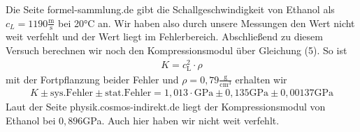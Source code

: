 \documentclass[a4paper, 12pt]{scrartcl}
\begin{document}
Die Seite formel-sammlung.de gibt die Schallgeschwindigkeit von Ethanol als $c_L= 1190\frac{\textrm{m}}{\textrm{s}}$ bei 20°C an. Wir haben also durch unsere Messungen den Wert nicht weit verfehlt und der Wert liegt im Fehlerbereich. Abschließend zu diesem Versuch berechnen wir noch den Kompressionsmodul über Gleichung (5). 
So ist 
\begin{align*}
K = c_\textrm{L}^2 \cdot \rho
\end{align*}
mit der Fortpflanzung beider Fehler und $\rho=0,79 \frac{\textrm{g}}{\textrm{cm}^3}$ erhalten wir 
\begin{align*}
K \pm \textrm{sys.Fehler} \pm \textrm{stat.Fehler} = 1,013 \cdot \textrm{GPa} \pm 0,135\textrm{GPa} \pm 0,00137 \textrm{GPa}
\end{align*}
Laut der Seite physik.cosmos-indirekt.de liegt der Kompressionsmodul von Ethanol bei $0,896$GPa. Auch hier haben wir nicht weit verfehlt. 


\newpage
\end{document}
